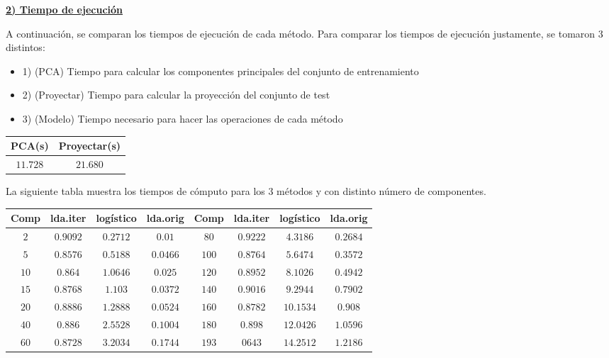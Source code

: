 \pagebreak
\underline{\textbf{2) Tiempo de ejecución}}

A continuación, se comparan los tiempos de ejecución de cada método. Para comparar los tiempos de ejecución justamente, se tomaron 3 distintos:

\begin{itemize}
\item 1) (PCA) Tiempo para calcular los componentes principales del conjunto de entrenamiento
\item 2) (Proyectar) Tiempo para calcular la proyección del conjunto de test
\item 3) (Modelo) Tiempo necesario para hacer las operaciones de cada método

\end{itemize}

\begin{center}
\begin{tabular}{ | c | c |} 
\hline
 PCA(s) & Proyectar(s) \\ 
\hline
\hline
$11.728$ & $21.680$ \\ 
\hline
\hline
\end{tabular}
\end{center}

La siguiente tabla muestra los tiempos de cómputo para los 3 métodos y con distinto número de componentes. 

\begin{center}
\begin{tabular}{ | c | c | c | c ||| c | c | c | c |} 
\hline
Comp & lda.iter & logístico & lda.orig   & Comp & lda.iter & logístico & lda.orig   \\ 
\hline
\hline
$2$ & $0.9092$ & $0.2712$ & $0.01$ & $80$ & $0.9222$ & $4.3186$ & $0.2684$ \\
$5$ & $0.8576$ & $0.5188$ & $0.0466$ & $100$ & $0.8764$ & $5.6474$ & $0.3572$ \\
$10$ & $0.864$ & $1.0646$ & $0.025$ & $120$ & $0.8952$ & $8.1026$ & $0.4942$ \\
$15$ & $0.8768$ & $1.103$ & $0.0372$ & $140$ & $0.9016$ & $9.2944$ & $0.7902$ \\
$20$ & $0.8886$ & $1.2888$ & $0.0524$ & $160$ & $0.8782$ & $10.1534$ & $0.908$ \\
$40$ & $0.886$ & $2.5528$ & $0.1004$ & $180$ & $0.898$ & $12.0426$ & $1.0596$ \\
$60$ & $0.8728$ & $3.2034$ & $0.1744$ & $193$ & $0643$ & $14.2512$ & $1.2186$ \\
\hline
\hline
\end{tabular}
\end{center}

